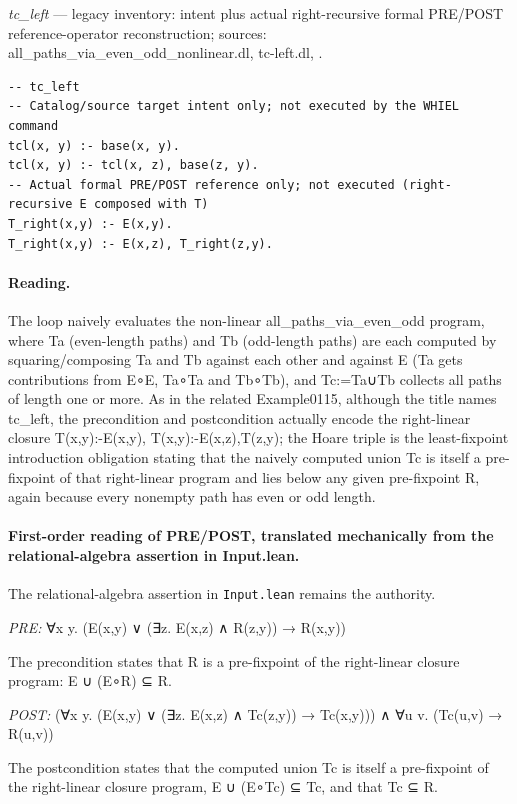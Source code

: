 \documentclass[10pt]{article}
\begin{document}
{\raggedright\textit{tc\_left} --- legacy inventory:  intent plus actual right-recursive formal PRE/POST reference-operator reconstruction; sources: all\_paths\_via\_even\_odd\_nonlinear.dl, tc-left.dl, .\par}

\begin{Verbatim}[fontsize=\scriptsize,breaklines=true,breakanywhere=true,frame=single,framesep=1.5mm]
-- tc_left
-- Catalog/source target intent only; not executed by the WHIEL command
tcl(x, y) :- base(x, y).
tcl(x, y) :- tcl(x, z), base(z, y).
-- Actual formal PRE/POST reference only; not executed (right-recursive E composed with T)
T_right(x,y) :- E(x,y).
T_right(x,y) :- E(x,z), T_right(z,y).
\end{Verbatim}

\paragraph{Reading.} The loop naively evaluates the non-linear all\_paths\_via\_even\_odd program, where Ta (even-length paths) and Tb (odd-length paths) are each computed by squaring/composing Ta and Tb against each other and against E (Ta gets contributions from E∘E, Ta∘Ta and Tb∘Tb), and Tc:=Ta∪Tb collects all paths of length one or more. As in the related Example0115, although the title names tc\_left, the precondition and postcondition actually encode the right-linear closure T(x,y):-E(x,y), T(x,y):-E(x,z),T(z,y); the Hoare triple is the least-fixpoint introduction obligation stating that the naively computed union Tc is itself a pre-fixpoint of that right-linear program and lies below any given pre-fixpoint R, again because every nonempty path has even or odd length.

\paragraph{First-order reading of PRE/POST, translated mechanically from the relational-algebra assertion in Input.lean.} The relational-algebra assertion in \texttt{Input.lean} remains the authority.

\textit{PRE:} ∀x y. (E(x,y) ∨ (∃z. E(x,z) ∧ R(z,y)) → R(x,y))\par The precondition states that R is a pre-fixpoint of the right-linear closure program: E ∪ (E∘R) ⊆ R.

\textit{POST:} (∀x y. (E(x,y) ∨ (∃z. E(x,z) ∧ Tc(z,y)) → Tc(x,y))) ∧ ∀u v. (Tc(u,v) → R(u,v))\par The postcondition states that the computed union Tc is itself a pre-fixpoint of the right-linear closure program, E ∪ (E∘Tc) ⊆ Tc, and that Tc ⊆ R.
\end{document}
